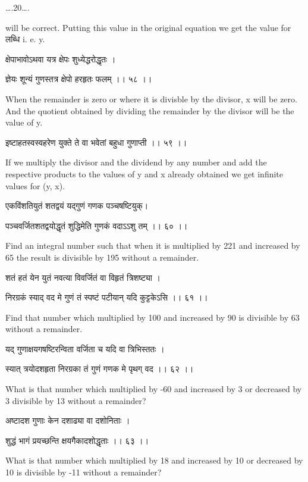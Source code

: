 \documentclass[]{article}
\date{}
\begin{document}
{\ldots{}.20\ldots{}.}

{will be correct. Putting this value in the original equation we get the
value for लब्धि i. e. y.}

{क्षेपाभावोऽथवा यत्र क्षेपः शुध्येद्धरोद्धृतः । }

{ज्ञेयः शून्यं गुणस्तत्र क्षेपो हरहृतः फलम् ।। ५८ ।। }

{When the remainder is zero or where it is divisble by the divisor, x
will be zero. And the quotient obtained by dividing the remainder by the
divisor will be the value of y. }

{इष्टाहतस्वस्वहरेण युक्ते ते वा भवेतां बहुधा गुणाप्ती ।। ५९ ।। }

{If we multiply the divisor and the dividend by any number and add the
respective products to the values of y and x already obtained we get
infinite values for (y, x).}

{एकविंशतियुतं शतद्वयं यद्गुणं गणक पञ्चषष्टियुक्। }

{पञ्चवर्जितशतद्वयोद्धृतं शुद्धिमेति गुणकं वदाऽऽशु तम् ।। ६० ।। }

{Find an integral number such that when it is multiplied by 221 and
increased by 65 the result is divisible by 195 without a remainder.}

{शतं हतं येन युतं नवत्या विवर्जितं वा विहृतं त्रिशष्ट्या । }

{निरग्रकं स्याद् वद मे गुणं तं स्पष्टं पटीयान् यदि कुट्टकेऽसि ।। ६१ ।। }

{Find that number which multiplied by 100 and increased by 90 is
divisible by 63 without a remainder.}

{यद् गुणाक्षयगषष्टिरन्विता वर्जिता च यदि वा त्रिभिस्ततः । }

{स्यात् त्रयोदशहृता निरग्रका तं गुणं गणक मे पृथग् वद ।। ६२ ।। }

{What is that number which multiplied by -60 and increased by 3 or
decreased by 3 divisible by 13 without a remainder?}

{अष्टादश गुणाः केन दशाढ्या वा दशोनिताः । }

{शुद्धं भागं प्रयच्छन्ति क्षयगैकादशोद्धृताः ।। ६३ ।। }

{What is that number which multiplied by 18 and increased by 10 or
decreased by 10 is divisible by -11 without a remainder?}
\end{document}

